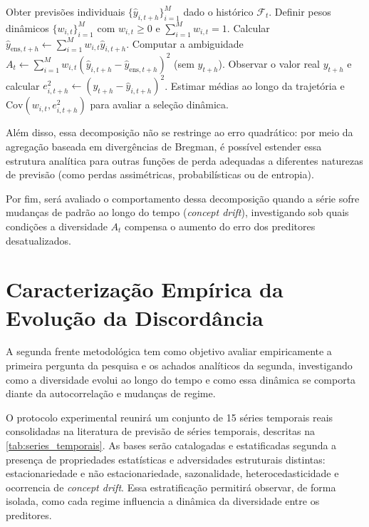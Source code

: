 \begin{algorithm}[ht]
\caption{Avaliação sequencial da decomposição e da covariância temporal}
\label{alg:decomposicao_temporal}
\begin{algorithmic}[1]
    \State Obter previsões individuais $\{\hat{y}_{i,t+h}\}_{i=1}^{M}$ dado o histórico $\mathcal{F}_t$.
    \State Definir pesos dinâmicos $\{w_{i,t}\}_{i=1}^{M}$ com $w_{i,t} \ge 0$ e $\sum_{i=1}^{M} w_{i,t} = 1$.
    \State Calcular $\hat{y}_{\text{ens},t+h} \gets \sum_{i=1}^{M} w_{i,t}\hat{y}_{i,t+h}$.
    \State Computar a ambiguidade $A_t \gets \sum_{i=1}^{M} w_{i,t}(\hat{y}_{i,t+h} - \hat{y}_{\text{ens},t+h})^2$ (sem $y_{t+h}$).
    \State Observar o valor real $y_{t+h}$ e calcular $e_{i,t+h}^2 \gets (y_{t+h} - \hat{y}_{i,t+h})^2$.
\EndFor
\State Estimar médias ao longo da trajetória e $\mathrm{Cov}(w_{i,t}, e_{i,t+h}^2)$ para avaliar a seleção dinâmica.
\end{algorithmic}
\end{algorithm}

Além disso, essa decomposição não se restringe ao erro quadrático: por meio da agregação baseada em divergências de Bregman, é possível estender essa estrutura analítica para outras funções de perda adequadas a diferentes naturezas de previsão (como perdas assimétricas, probabilísticas ou de entropia).

Por fim, será avaliado o comportamento dessa decomposição quando a série sofre mudanças de padrão ao longo do tempo (\textit{concept drift}), investigando sob quais condições a diversidade $A_t$ compensa o aumento do erro dos preditores desatualizados.

\section{Caracterização Empírica da Evolução da Discordância}
A segunda frente metodológica tem como objetivo avaliar empiricamente a primeira pergunta da pesquisa e os achados analíticos da segunda, investigando como a diversidade evolui ao longo do tempo e como essa dinâmica se comporta diante da autocorrelação e mudanças de regime. 

O protocolo experimental reunirá um conjunto de 15 séries temporais reais consolidadas na literatura de previsão de séries temporais, descritas na \ref{tab:series_temporais}. As bases serão catalogadas e estatificadas segunda a presença de propriedades estatísticas e adversidades estruturais distintas: estacionariedade e não estacionariedade, sazonalidade, heterocedasticidade e ocorrencia de \textit{concept drift}. Essa estratificação permitirá observar, de forma isolada, como cada regime influencia a dinâmica da diversidade entre os preditores.


